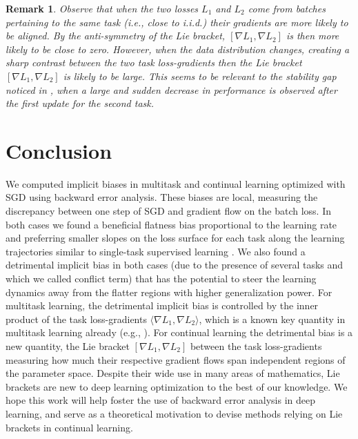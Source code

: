 \documentclass{article}
\newtheorem{remark}[theorem]{Remark}
\begin{document}
\begin{remark} Observe that when the two losses $L_1$ and $L_2$  come from batches pertaining to the same task (i.e., close to i.i.d.)  their gradients are more likely to be aligned. By the anti-symmetry of the Lie bracket, $[\nabla L_1, \nabla L_2]$  is then more likely to be close to zero. However, when the data distribution changes, creating a sharp contrast between the two task loss-gradients then the Lie bracket $[\nabla L_1, \nabla L_2]$  is likely to be large. This seems to be relevant to the \emph{stability gap} noticed in \cite{lange2023continual}, when a large and sudden decrease in performance is  observed after the first update for the second task. 
\end{remark}

\section{Conclusion}
We computed implicit biases in multitask and continual learning optimized with SGD using backward error analysis. These biases are local, measuring the discrepancy between one step of SGD and gradient flow on the batch loss. In both cases we found a beneficial flatness bias proportional to the learning rate and preferring smaller slopes on the loss surface for each task along the learning trajectories similar to single-task supervised learning \cite{barrett2021implicit,smith2021on}. We also found a detrimental implicit bias in both cases (due to the presence of several tasks and which we called conflict term) that has the potential to steer the learning dynamics away from the flatter regions with higher generalization power. For multitask learning, the detrimental implicit bias is controlled by the inner product of the task loss-gradients $\langle \nabla L_1, \nabla L_2 \rangle$, which is a known key quantity in multitask learning already (e.g., \cite{yu2020gradient_surgery,wang2021gradient_vaccine,lee2022sequential,anguelov2020_pick_a_sign}). For continual learning the detrimental bias is a new quantity, the Lie bracket $[\nabla L_1, \nabla L_2]$ between the task loss-gradients measuring how much their respective gradient flows span independent regions of the parameter space. Despite their wide use in many areas of mathematics, Lie brackets are new to deep learning optimization to the best of our knowledge. We hope this work will help foster the use of backward error analysis in deep learning, and serve as a theoretical motivation to devise methods relying on Lie brackets in continual learning.
\end{document}
